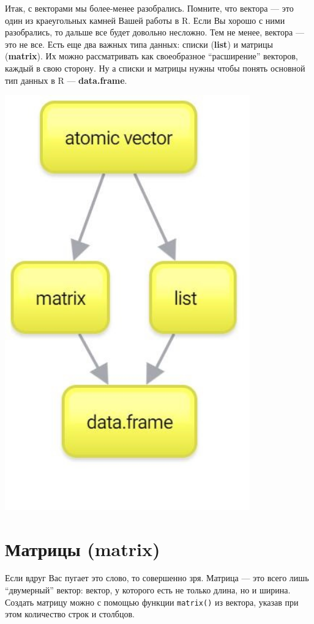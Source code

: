 \documentclass[
]{book}
\begin{document}
Итак, с векторами мы более-менее разобрались. Помните, что вектора --- это один из краеугольных камней Вашей работы в R. Если Вы хорошо с ними разобрались, то дальше все будет довольно несложно. Тем не менее, вектора --- это не все. Есть еще два важных типа данных: списки (\textbf{list}) и матрицы (\textbf{matrix}). Их можно рассматривать как своеобразное ``расширение'' векторов, каждый в свою сторону. Ну а списки и матрицы нужны чтобы понять основной тип данных в R --- \textbf{data.frame}.

\includegraphics[width=4.16667in,height=\textheight]{images/New-Mind-Map.jpg}

\hypertarget{matrix}{%
\section{Матрицы (matrix)}\label{matrix}}

Если вдруг Вас пугает это слово, то совершенно зря. Матрица --- это всего лишь ``двумерный'' вектор: вектор, у которого есть не только длина, но и ширина. Создать матрицу можно с помощью функции \texttt{matrix()} из вектора, указав при этом количество строк и столбцов.
\end{document}
